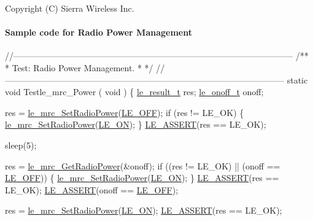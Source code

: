 Copyright (C) Sierra Wireless Inc. \hypertarget{c_mrcRadioPower}{}\paragraph{Sample code for Radio Power Management}\label{c_mrcRadioPower}

\begin{DoxyCodeInclude}
\textcolor{comment}{//--------------------------------------------------------------------------------------------------}\textcolor{comment}{}
\textcolor{comment}{/**}
\textcolor{comment}{ * Test: Radio Power Management.}
\textcolor{comment}{ *}
\textcolor{comment}{ */}
\textcolor{comment}{//--------------------------------------------------------------------------------------------------}
\textcolor{keyword}{static} \textcolor{keywordtype}{void} Testle\_mrc\_Power
(
    \textcolor{keywordtype}{void}
)
\{
    \hyperlink{le__basics_8h_a1cca095ed6ebab24b57a636382a6c86c}{le\_result\_t}   res;
    \hyperlink{le__basics_8h_ae2138c90c41d30e2d510be01d8b374da}{le\_onoff\_t}    onoff;

    res = \hyperlink{le__mrc__interface_8h_a78bd27d92337e2122320f41bcaa5480f}{le\_mrc\_SetRadioPower}(\hyperlink{le__basics_8h_ae2138c90c41d30e2d510be01d8b374daa66236546b5af0328d2db0e6970f67e50}{LE\_OFF});
    \textcolor{keywordflow}{if} (res != LE\_OK)
    \{
        \hyperlink{le__mrc__interface_8h_a78bd27d92337e2122320f41bcaa5480f}{le\_mrc\_SetRadioPower}(\hyperlink{le__basics_8h_ae2138c90c41d30e2d510be01d8b374daa73623e8b9450d62517b467b9be2afce8}{LE\_ON});
    \}
    \hyperlink{le__log_8h_ac0dbbef91dc0fed449d0092ff0557b39}{LE\_ASSERT}(res == LE\_OK);

    sleep(5);

    res = \hyperlink{le__mrc__interface_8h_aac51332c6c84e460746eb1ad45c064d6}{le\_mrc\_GetRadioPower}(&onoff);
    \textcolor{keywordflow}{if} ((res != LE\_OK) || (onoff == \hyperlink{le__basics_8h_ae2138c90c41d30e2d510be01d8b374daa66236546b5af0328d2db0e6970f67e50}{LE\_OFF}))
    \{
        \hyperlink{le__mrc__interface_8h_a78bd27d92337e2122320f41bcaa5480f}{le\_mrc\_SetRadioPower}(\hyperlink{le__basics_8h_ae2138c90c41d30e2d510be01d8b374daa73623e8b9450d62517b467b9be2afce8}{LE\_ON});
    \}
    \hyperlink{le__log_8h_ac0dbbef91dc0fed449d0092ff0557b39}{LE\_ASSERT}(res == LE\_OK);
    \hyperlink{le__log_8h_ac0dbbef91dc0fed449d0092ff0557b39}{LE\_ASSERT}(onoff == \hyperlink{le__basics_8h_ae2138c90c41d30e2d510be01d8b374daa66236546b5af0328d2db0e6970f67e50}{LE\_OFF});

    res = \hyperlink{le__mrc__interface_8h_a78bd27d92337e2122320f41bcaa5480f}{le\_mrc\_SetRadioPower}(\hyperlink{le__basics_8h_ae2138c90c41d30e2d510be01d8b374daa73623e8b9450d62517b467b9be2afce8}{LE\_ON});
    \hyperlink{le__log_8h_ac0dbbef91dc0fed449d0092ff0557b39}{LE\_ASSERT}(res == LE\_OK);


\end{DoxyCodeInclude}
